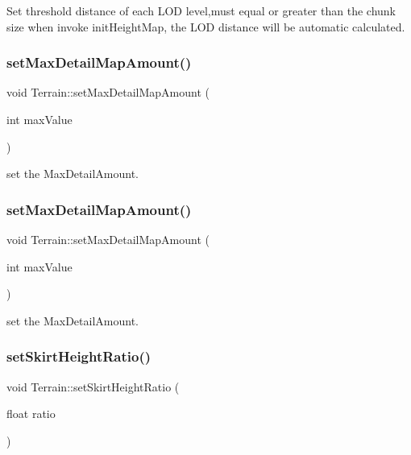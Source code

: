 Set threshold distance of each L\+OD level,must equal or greater than the chunk size  when invoke init\+Height\+Map, the L\+OD distance will be automatic calculated. \mbox{\label{classTerrain_a8298eeb97583ef78a369151f0830c010}} 
\subsubsection{\texorpdfstring{set\+Max\+Detail\+Map\+Amount()}{setMaxDetailMapAmount()}\hspace{0.1cm}{\footnotesize\ttfamily [1/2]}}
{\footnotesize\ttfamily void Terrain\+::set\+Max\+Detail\+Map\+Amount (\begin{DoxyParamCaption}\item[{int}]{max\+Value }\end{DoxyParamCaption})}

set the Max\+Detail\+Amount. \mbox{\label{classTerrain_a8298eeb97583ef78a369151f0830c010}} 
\subsubsection{\texorpdfstring{set\+Max\+Detail\+Map\+Amount()}{setMaxDetailMapAmount()}\hspace{0.1cm}{\footnotesize\ttfamily [2/2]}}
{\footnotesize\ttfamily void Terrain\+::set\+Max\+Detail\+Map\+Amount (\begin{DoxyParamCaption}\item[{int}]{max\+Value }\end{DoxyParamCaption})}

set the Max\+Detail\+Amount. \mbox{\label{classTerrain_a5a53caf1917be26897f35e35ae5b4f06}} 
\subsubsection{\texorpdfstring{set\+Skirt\+Height\+Ratio()}{setSkirtHeightRatio()}\hspace{0.1cm}{\footnotesize\ttfamily [1/2]}}
{\footnotesize\ttfamily void Terrain\+::set\+Skirt\+Height\+Ratio (\begin{DoxyParamCaption}\item[{float}]{ratio }\end{DoxyParamCaption})}

